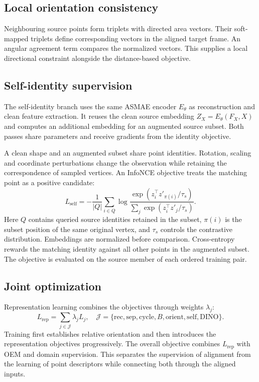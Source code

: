 \subsection{Local orientation consistency}
Neighbouring source points form triplets with directed area vectors. Their soft-mapped triplets define corresponding vectors in the aligned target frame. An angular agreement term compares the normalized vectors. This supplies a local directional constraint alongside the distance-based objective.

\subsection{Self-identity supervision}
The self-identity branch uses the same ASMAE encoder $E_\theta$ as reconstruction and clean feature extraction. It reuses the clean source embedding $Z_X=E_\theta(F_X,X)$ and computes an additional embedding for an augmented source subset. Both passes share parameters and receive gradients from the identity objective.

A clean shape and an augmented subset share point identities. Rotation, scaling and coordinate perturbations change the observation while retaining the correspondence of sampled vertices. An InfoNCE objective \citep{Oord_2018_CPC} treats the matching point as a positive candidate:
\begin{equation}
 L_{\mathrm{self}}=-\frac{1}{|Q|}\sum_{i\in Q}
 \log\frac{\exp(z_i^\top z'_{\pi(i)}/\tau_s)}
 {\sum_j\exp(z_i^\top z'_j/\tau_s)}.
\end{equation}
Here $Q$ contains queried source identities retained in the subset, $\pi(i)$ is the subset position of the same original vertex, and $\tau_s$ controls the contrastive distribution. Embeddings are normalized before comparison. Cross-entropy rewards the matching identity against all other points in the augmented subset. The objective is evaluated on the source member of each ordered training pair.

\subsection{Joint optimization}
Representation learning combines the objectives through weights $\lambda_j$:
\begin{equation}
 L_{\mathrm{rep}}=\sum_{j\in\mathcal J}\lambda_jL_j,
 \quad\mathcal J=\{\mathrm{rec,sep,cycle},B,\mathrm{orient,self,DINO}\}.
\end{equation}
Training first establishes relative orientation and then introduces the representation objectives progressively. The overall objective combines $L_{\mathrm{rep}}$ with OEM and domain supervision. This separates the supervision of alignment from the learning of point descriptors while connecting both through the aligned inputs.

